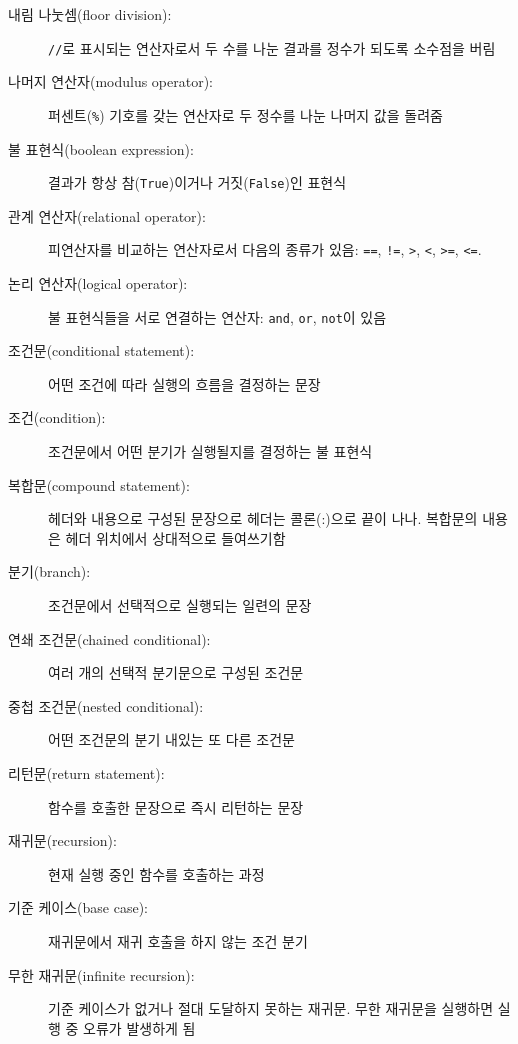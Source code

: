 \documentclass[10pt]{book}
\begin{document}
\begin{description}

\item[내림 나눗셈(floor division):] {\tt //}로 표시되는 연산자로서 두
  수를 나눈 결과를 정수가 되도록 소수점을 버림

\item[나머지 연산자(modulus operator):] 퍼센트({\tt \%}) 기호를 갖는
  연산자로 두 정수를 나눈 나머지 값을 돌려줌

\item[불 표현식(boolean expression):] 결과가 항상 참({\tt True})이거나
  거짓({\tt False})인 표현식

\item[관계 연산자(relational operator):] 피연산자를 비교하는 연산자로서
  다음의 종류가 있음: {\tt ==}, {\tt !=}, {\tt >}, {\tt <}, {\tt >=},
  {\tt <=}.

\item[논리 연산자(logical operator):] 불 표현식들을 서로 연결하는
  연산자: {\tt and}, {\tt or}, {\tt not}이 있음

\item[조건문(conditional statement):] 어떤 조건에 따라 실행의 흐름을
  결정하는 문장

\item[조건(condition):]  조건문에서 어떤 분기가 실행될지를 결정하는 불 표현식

\item[복합문(compound statement):] 헤더와 내용으로 구성된 문장으로
  헤더는 콜론(:)으로 끝이 나나. 복합문의 내용은 헤더 위치에서
  상대적으로 들여쓰기함

\item[분기(branch):] 조건문에서 선택적으로 실행되는 일련의 문장

\item[연쇄 조건문(chained conditional):]  여러 개의 선택적 분기문으로 구성된 조건문

\item[중첩 조건문(nested conditional):]  어떤 조건문의 분기 내있는 또 다른 조건문

\item[리턴문(return statement):] 함수를 호출한 문장으로 즉시 리턴하는 문장

\item[재귀문(recursion):]  현재 실행 중인 함수를 호출하는 과정

\item[기준 케이스(base case):]  재귀문에서 재귀 호출을 하지 않는 조건 분기

\item[무한 재귀문(infinite recursion):] 기준 케이스가 없거나 절대
  도달하지 못하는 재귀문.  무한 재귀문을 실행하면 실행 중 오류가
  발생하게 됨

\end{description}
\end{document}

